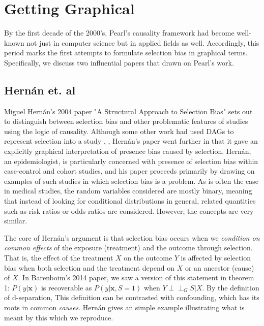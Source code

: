 \documentclass[12pt,twoside]{reedthesis}
\theoremstyle{definition}
\newcommand{\dsep}{\perp \!\!\!\perp}
\begin{document}
\section{Getting Graphical}


By the first decade of the 2000's, Pearl's causality framework had become well-known not just in computer science but in applied fields as well. Accordingly, this period marks the first attempts to formulate selection bias in graphical terms. Specifically, we discuss two influential papers that drawn on Pearl's work.

\subsection{Hern\'an et. al}

Miguel Hern\'an's 2004 paper "A Structural Approach to Selection Bias" sets out to distinguish between selection bias and other problematic features of studies using the logic of causality. Although some other work had used DAGs to represent selection into a study \citep{Robbins_2001}, \citep{Pearl_1995}, Hern\'an's paper went further in that it gave an explicitly graphical interpretation of presence bias caused by selection. Hern\'an, an epidemiologist, is particularly concerned with presence of selection bias within case-control and cohort studies, and his paper proceeds primarily by drawing on examples of such studies in which selection bias is a problem. As is often the case in medical studies, the random variables considered are mostly binary, meaning that instead of looking for conditional distributions in general, related quantities such as risk ratios or odds ratios are considered. However, the concepts are very similar.

The core of Hern\'an's argument is that selection bias occurs when we \emph{condition on common effects} of the exposure (treatment) and the outcome through selection. That is, the effect of the treatment $X$ on the outcome $Y$ is affected by selection bias when both selection and the treatment depend on $X$ or an ancestor (cause) of $X$.  In Barenboim's  2014 paper, we saw a version of this statement in theorem 1: $P(y|\mathbf{x})$ is recoverable as $P(y|\mathbf{x}, S = 1)$ when $Y \dsep_G S | X$. By the definition of d-separation,  This definition can be contrasted with confounding, which has its roots in common \emph{causes}. Hern\'an gives an simple example illustrating what is meant by this which we reproduce. 
\end{document}
